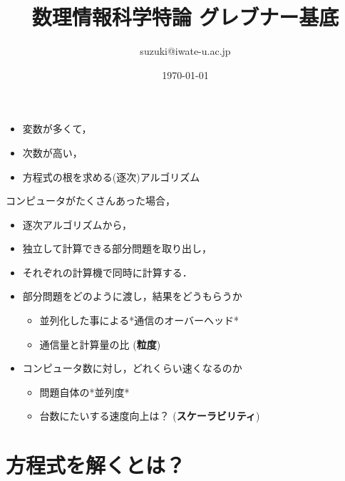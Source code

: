 \documentclass[a4j]{jarticle}
\author{suzuki@iwate-u.ac.jp}
\date{\today}
\title{数理情報科学特論 グレブナー基底}
\begin{document}
\maketitle
\tableofcontents

\begin{itemize}
\item 変数が多くて，

\item 次数が高い，

\item 方程式の根を求める(逐次)アルゴリズム
\end{itemize}

コンピュータがたくさんあった場合，

\begin{itemize}
\item 逐次アルゴリズムから，

\item 独立して計算できる部分問題を取り出し，

\item それぞれの計算機で同時に計算する．

\item 部分問題をどのように渡し，結果をどうもらうか

\begin{itemize}
\item 並列化した事による*通信のオーバーヘッド*

\item 通信量と計算量の比 (\textbf{粒度})
\end{itemize}

\item コンピュータ数に対し，どれくらい速くなるのか

\begin{itemize}
\item 問題自体の*並列度*

\item 台数にたいする速度向上は？ (\textbf{スケーラビリティ})
\end{itemize}
\end{itemize}

\section{方程式を解くとは？}
\label{sec:org62722c7}
\end{document}
